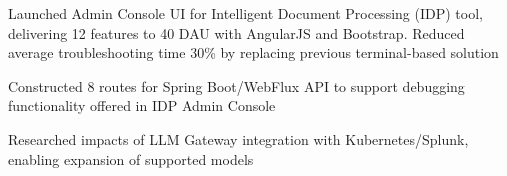 \documentclass[letterpaper,11pt]{article}
\newcommand{\resumeItem}[1]{
  \item\small{
    {#1 \vspace{-1pt}}
  }
}
\begin{document}

        \resumeItem{Launched Admin Console UI for Intelligent Document Processing (IDP) tool, delivering 12 features to 40 DAU with AngularJS and Bootstrap. Reduced average troubleshooting time 30\% by replacing previous terminal-based solution}
    
        
        \resumeItem{Constructed 8 routes for Spring Boot/WebFlux API to support debugging functionality offered in IDP Admin Console}
        
        
        

        
        \resumeItem{Researched impacts of LLM Gateway integration with Kubernetes/Splunk, enabling expansion of supported models}
        
\end{document}
